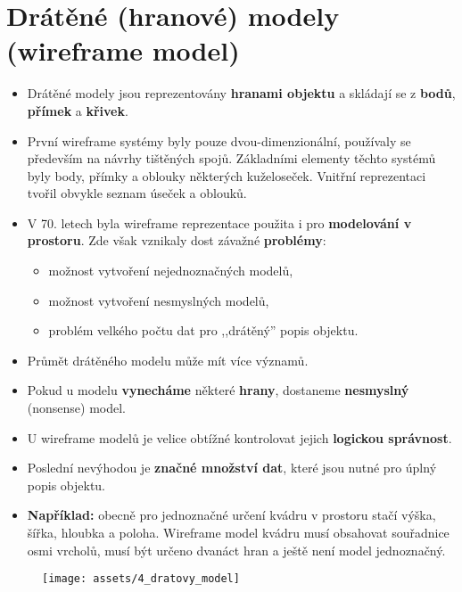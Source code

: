 \section{Drátěné (hranové) modely (wireframe model)}
\begin{itemize}
    \item Drátěné modely jsou reprezentovány \textbf{hranami objektu} a skládají se z \textbf{bodů}, \textbf{přímek} a \textbf{křivek}.
    \item První wireframe systémy byly pouze dvou-dimenzionální, používaly se především na návrhy tištěných spojů. Základními elementy těchto systémů byly body, přímky a oblouky některých kuželoseček. Vnitřní reprezentaci tvořil obvykle seznam úseček a oblouků.
    \item V 70. letech byla wireframe reprezentace použita i pro \textbf{modelování v prostoru}. Zde však vznikaly dost závažné \textbf{problémy}:
          \begin{itemize}
              \item možnost vytvoření nejednoznačných modelů,
              \item možnost vytvoření nesmyslných modelů,
              \item problém velkého počtu dat pro ,,drátěný'' popis objektu.
          \end{itemize}
    \item Průmět drátěného modelu může mít více významů.
    \item Pokud u modelu \textbf{vynecháme} některé \textbf{hrany}, dostaneme \textbf{nesmyslný} (nonsense) model.
    \item U wireframe modelů je velice obtížné kontrolovat jejich \textbf{logickou správnost}.
    \item Poslední nevýhodou je \textbf{značné množství dat}, které jsou nutné pro úplný popis objektu.
    \item \textbf{Například:} obecně pro jednoznačné určení kvádru v prostoru stačí výška, šířka, hloubka a poloha. Wireframe model kvádru musí obsahovat souřadnice osmi vrcholů, musí být určeno dvanáct hran a ještě není model jednoznačný.
\end{itemize}

\begin{figure}[H]
    \centering
    \texttt{[image: assets/4\_dratovy\_model]}
\end{figure}

